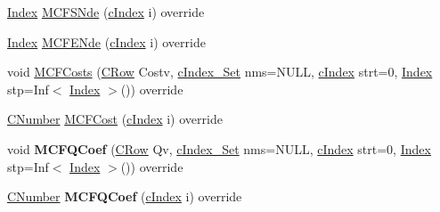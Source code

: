 \begin{DoxyCompactItemize}
\item 
\mbox{\hyperlink{class_m_c_f_class_ad53d6229d7ec28555a9c9c2fd9abf773}{Index}} \mbox{\hyperlink{class_m_c_f_simplex_a5e055b278894b83056cf4e5936ba2c04}{M\+C\+F\+S\+Nde}} (\mbox{\hyperlink{class_m_c_f_class_a76aaabb20535c51a2752b93f6c38fe54}{c\+Index}} i) override
\item 
\mbox{\hyperlink{class_m_c_f_class_ad53d6229d7ec28555a9c9c2fd9abf773}{Index}} \mbox{\hyperlink{class_m_c_f_simplex_a0681160a038aafd90866b8b2cb49c29c}{M\+C\+F\+E\+Nde}} (\mbox{\hyperlink{class_m_c_f_class_a76aaabb20535c51a2752b93f6c38fe54}{c\+Index}} i) override
\item 
void \mbox{\hyperlink{class_m_c_f_simplex_a1a7da972e0e55e14fe9459fd5cd7d374}{M\+C\+F\+Costs}} (\mbox{\hyperlink{class_m_c_f_class_a62409402be4e4b301e1a568f99f877be}{C\+Row}} Costv, \mbox{\hyperlink{class_m_c_f_class_a81575b2d4e4d5636b17170432150ae69}{c\+Index\+\_\+\+Set}} nms=N\+U\+LL, \mbox{\hyperlink{class_m_c_f_class_a76aaabb20535c51a2752b93f6c38fe54}{c\+Index}} strt=0, \mbox{\hyperlink{class_m_c_f_class_ad53d6229d7ec28555a9c9c2fd9abf773}{Index}} stp=Inf$<$ \mbox{\hyperlink{class_m_c_f_class_ad53d6229d7ec28555a9c9c2fd9abf773}{Index}} $>$()) override
\item 
\mbox{\hyperlink{class_m_c_f_class_a24d0627ba8213afe1ec4ebeb4508e8f1}{C\+Number}} \mbox{\hyperlink{class_m_c_f_simplex_ae8d376071c83375949461c34d5186b40}{M\+C\+F\+Cost}} (\mbox{\hyperlink{class_m_c_f_class_a76aaabb20535c51a2752b93f6c38fe54}{c\+Index}} i) override
\item 
\mbox{\label{class_m_c_f_simplex_afda1b4424afc83c9fb8209c1fc164265}} 
void {\bfseries M\+C\+F\+Q\+Coef} (\mbox{\hyperlink{class_m_c_f_class_a62409402be4e4b301e1a568f99f877be}{C\+Row}} Qv, \mbox{\hyperlink{class_m_c_f_class_a81575b2d4e4d5636b17170432150ae69}{c\+Index\+\_\+\+Set}} nms=N\+U\+LL, \mbox{\hyperlink{class_m_c_f_class_a76aaabb20535c51a2752b93f6c38fe54}{c\+Index}} strt=0, \mbox{\hyperlink{class_m_c_f_class_ad53d6229d7ec28555a9c9c2fd9abf773}{Index}} stp=Inf$<$ \mbox{\hyperlink{class_m_c_f_class_ad53d6229d7ec28555a9c9c2fd9abf773}{Index}} $>$()) override
\item 
\mbox{\label{class_m_c_f_simplex_a32616812e5ab40a5425d55752a12f5cd}} 
\mbox{\hyperlink{class_m_c_f_class_a24d0627ba8213afe1ec4ebeb4508e8f1}{C\+Number}} {\bfseries M\+C\+F\+Q\+Coef} (\mbox{\hyperlink{class_m_c_f_class_a76aaabb20535c51a2752b93f6c38fe54}{c\+Index}} i) override

\end{DoxyCompactItemize}
